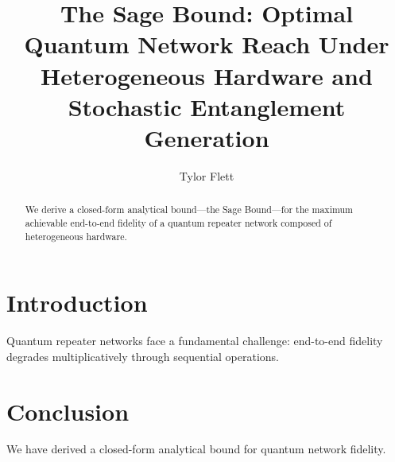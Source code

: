 \documentclass[aps,pra,reprint,amsmath,amssymb,superscriptaddress]{revtex4-2}
\begin{document}
\title{The Sage Bound: Optimal Quantum Network Reach Under\\
Heterogeneous Hardware and Stochastic Entanglement Generation}

\author{Tylor Flett}

\begin{abstract}
We derive a closed-form analytical bound---the Sage Bound---for the maximum achievable end-to-end fidelity of a quantum repeater network composed of heterogeneous hardware.
\end{abstract}

\maketitle

\section{Introduction}
Quantum repeater networks face a fundamental challenge: end-to-end fidelity degrades multiplicatively through sequential operations.

\section{Conclusion}
We have derived a closed-form analytical bound for quantum network fidelity.
\end{document}
